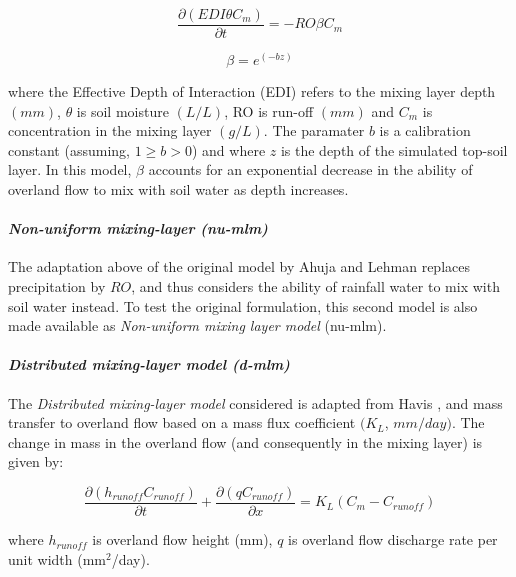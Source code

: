 \documentclass[]{article}
\let\oldparagraph\paragraph
\renewcommand{\paragraph}[1]{\oldparagraph{#1}\mbox{}}
\begin{document}
\begin{equation}
\frac{\partial (EDI \theta C_m)}{\partial t} = -RO \beta C_m
\label{eq:nu-mlm-ro}
\end{equation}

\begin{equation}
\beta = e^{(-bz)}
\label{eq:beta-nu-mlm}
\end{equation}

where the Effective Depth of Interaction (EDI) refers to the mixing
layer depth \((mm)\), \(\theta\) is soil moisture \((L/L)\), RO is
run-off \((mm)\) and \(C_m\) is concentration in the mixing layer
\((g/L)\). The paramater \(b\) is a calibration constant (assuming,
\(1 \ge b > 0\)) and where \(z\) is the depth of the simulated top-soil
layer. In this model, \(\beta\) accounts for an exponential decrease in
the ability of overland flow to mix with soil water as depth increases.

\hypertarget{section-1}{%
\paragraph{\texorpdfstring{\textit{Non-uniform mixing-layer (nu-mlm)}}{}}\label{section-1}}

The adaptation above of the original model by Ahuja and Lehman replaces
precipitation by \(RO\), and thus considers the ability of rainfall
water to mix with soil water instead. To test the original formulation,
this second model is also made available as
\textit{Non-uniform mixing layer model} (nu-mlm).

\hypertarget{section-2}{%
\paragraph{\texorpdfstring{\textit{Distributed mixing-layer model (d-mlm)}}{}}\label{section-2}}

The \textit{Distributed mixing-layer model} considered is adapted from
Havis \citeyearpar{Havis1992}, and mass transfer to overland flow based
on a mass flux coefficient \((K_L\), \(mm/day)\). The change in mass in
the overland flow (and consequently in the mixing layer) is given by:

\begin{equation}
\frac{\partial (h_{runoff} C_{runoff}) }{\partial t} + \frac{\partial(qC_{runoff}) }{\partial x} = K_L (C_m - C_{runoff})
\label{eq:d-mlm-of}
\end{equation}

where \(h_{runoff}\) is overland flow height (mm), \(q\) is overland
flow discharge rate per unit width (mm\(^2\)/day).
\end{document}
